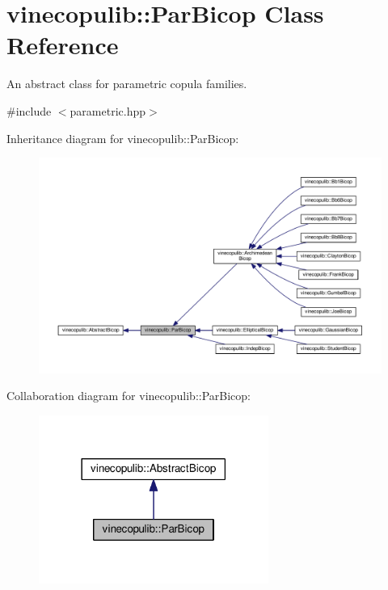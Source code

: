 \hypertarget{classvinecopulib_1_1_par_bicop}{}\section{vinecopulib\+:\+:Par\+Bicop Class Reference}
\label{classvinecopulib_1_1_par_bicop}


An abstract class for parametric copula families.  




{\ttfamily \#include $<$parametric.\+hpp$>$}



Inheritance diagram for vinecopulib\+:\+:Par\+Bicop\+:
\nopagebreak
\begin{figure}[H]
\begin{center}
\leavevmode
\includegraphics[width=350pt]{classvinecopulib_1_1_par_bicop__inherit__graph}
\end{center}
\end{figure}


Collaboration diagram for vinecopulib\+:\+:Par\+Bicop\+:
\nopagebreak
\begin{figure}[H]
\begin{center}
\leavevmode
\includegraphics[width=213pt]{classvinecopulib_1_1_par_bicop__coll__graph}
\end{center}
\end{figure}
